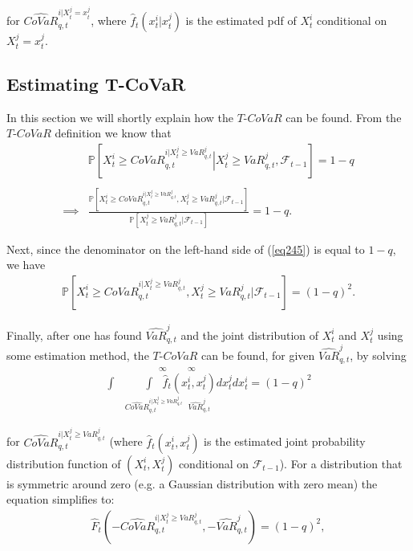 \documentclass[12pt]{article}
\begin{document}
\noindent for $\widehat{CoVaR}_{q,t}^{i|X_{t}^{j}= x_{t}^{j}}$, where $\widehat{f}_t\left(x^i_t\big|x^j_t\right)$ is the estimated pdf of $X^i_t$ conditional on $X^j_t=x^j_t$.


\subsection{Estimating T-CoVaR} \label{estcov}


In this section we will shortly explain how the $T$-$CoVaR$ can be found. From the $T$-$CoVaR$ definition we know that
\begin{align}
& \mathbb{P}\left[X^{i}_t\geq CoVaR_{q,t}^{i|X^{j}_t\geq VaR_{q,t}^{j}}\left|X^{j}_t\geq VaR_{q,t}^{j},\mathcal{F}_{t-1}\right.\right]=1-q \\
\nonumber\ \\
\implies & \frac{\mathbb{P}\left[X^{i}_t\geq CoVaR_{q,t}^{i|X^{j}_t\geq VaR_{q,t}^{j}},X^{j}_t\geq VaR_{q,t}^{j}\Big|\mathcal{F}_{t-1}\right]}
{\mathbb{P}\left[X^{j}_t\geq VaR_{q,t}^{j}\Big|\mathcal{F}_{t-1}\right]}=1-q  . \label{eq245}
\end{align}

\noindent Next, since the denominator on the left-hand side of (\ref{eq245}) is equal to $1-q$, we have
\begin{align}
\mathbb{P}\left[X^{i}_t\geq CoVaR_{q,t}^{i|X^{j}_t\geq VaR_{q,t}^{j}},X^{j}_t\geq VaR_{q,t}^{j}\Big|\mathcal{F}_{t-1}\right]=(1-q)^2 .
\end{align}


\noindent Finally, after one has found $\widehat{VaR}_{q,t}^{j}$ and the joint distribution of $X^i_t$ and $X^j_t$ using some estimation method, the $T$-$CoVaR$ can be found, for given $\widehat{VaR}_{q,t}^{j}$, by solving
\begin{align}
\stackrel{\ \ \infty \ \ \ \ \ \ \ \ \ \ \ \ \infty \ \ \ \ \ \ \ \ \ \ \ \ \ \ \ \ \ \ \ \ \ \ \ \ \ \ \ \ \ \ \ \ \ \ \ \ \ \ }
{\underset{\widehat{CoVaR}_{q,t}^{i|X_{t}^{j}\geq VaR_{q,t}^{j}} \ \ \ \widehat{VaR}_{q,t}^{j}\ \ \ \ \ \ \ \ \ \ \ \ \ \ \ \ \ \ \ \ \ \ \ \ \ \ \ \ \ \ \ \ \ \ \ \ \ \ \ \ \ \ \ \ \ \ \ }
{\int \ \ \ \ \ \ \ \ \ \ \  \int \ \ \ \widehat{f}_{t}(x_{t}^{i},x_{t}^{j})dx_{t}^{j}dx_{t}^{i}  = (1-q)^2  }}
\end{align}

\noindent for $\widehat{CoVaR}_{q,t}^{i|X_{t}^{j}\geq VaR_{q,t}^{j}}$ (where  $\widehat{f}_t(x^i_t,x^j_t)$ is the estimated joint probability distribution function of $(X^i_t,X^j_t)$ conditional on $\mathcal{F}_{t-1}$). For a distribution that is symmetric around zero (e.g. a Gaussian distribution with zero mean) the equation simplifies to:
\begin{align}
\widehat{F}_t\left(-\widehat{CoVaR}_{q,t}^{i|X_{t}^{j}\geq VaR_{q,t}^{j}},-\widehat{VaR}_{q,t}^{j}\right) = (1-q)^2 ,
\end{align}
\end{document}
